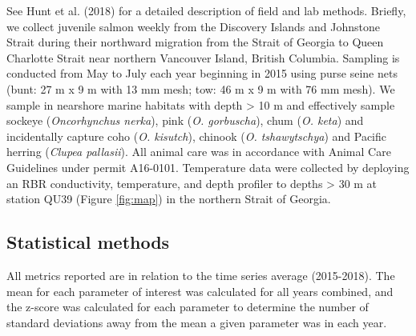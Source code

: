 \documentclass[fleqn,10pt]{wlpeerj} %
\begin{document}
See Hunt et al. (2018) for a detailed description of field and lab
methods. Briefly, we collect juvenile salmon weekly from the Discovery
Islands and Johnstone Strait during their northward migration from the
Strait of Georgia to Queen Charlotte Strait near northern Vancouver
Island, British Columbia. Sampling is conducted from May to July each
year beginning in 2015 using purse seine nets (bunt: 27 m x 9 m with 13
mm mesh; tow: 46 m x 9 m with 76 mm mesh). We sample in nearshore marine
habitats with depth \textgreater{} 10 m and effectively sample sockeye
(\emph{Oncorhynchus nerka}), pink (\emph{O. gorbuscha}), chum (\emph{O.
keta}) and incidentally capture coho (\emph{O. kisutch}), chinook
(\emph{O. tshawytschya}) and Pacific herring (\emph{Clupea pallasii}).
All animal care was in accordance with Animal Care Guidelines under
permit A16-0101. Temperature data were collected by deploying an RBR
conductivity, temperature, and depth profiler to depths \textgreater{}
30 m at station QU39 (Figure \ref{fig:map}) in the northern Strait of
Georgia.

\subsection*{Statistical methods}\label{statistical-methods}

All metrics reported are in relation to the time series average
(2015-2018). The mean for each parameter of interest was calculated for
all years combined, and the z-score was calculated for each parameter to
determine the number of standard deviations away from the mean a given
parameter was in each year.
\end{document}
